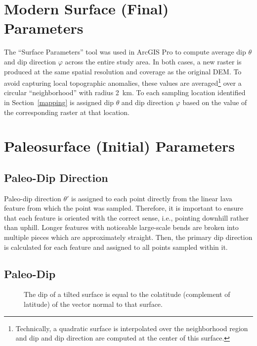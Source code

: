 \section{Modern Surface (Final) Parameters}
The ``Surface Parameters'' tool was used in ArcGIS Pro to compute average dip $\theta$ and dip direction $\varphi$ across the entire study area. In both cases, a new raster is produced at the same spatial resolution and coverage as the original \ac{DEM}. To avoid capturing local topographic anomalies, these values are averaged\footnote{Technically, a quadratic surface is interpolated over the neighborhood region and dip and dip direction are computed at the center of this surface.} over a circular ``neighborhood'' with radius \qty{2}{\km}. To each sampling location identified in Section~\ref{mapping} is assigned dip $\theta$ and dip direction $\varphi$ based on the value of the corresponding raster at that location.

\section{Paleosurface (Initial) Parameters}\label{paleosurface}
\subsection{Paleo-Dip Direction}
Paleo-dip direction $\theta'$ is assigned to each point directly from the linear lava feature from which the point was sampled. Therefore, it is important to ensure that each feature is oriented with the correct sense, i.e., pointing downhill rather than uphill. Longer features with noticeable large-scale bends are broken into multiple pieces which are approximately straight. Then, the primary dip direction is calculated for each feature and assigned to all points sampled within it.

\subsection{Paleo-Dip}\label{paleo-dip}

\def\figsize{3}
\begin{figure}
    \caption[Equivalence of slope and colatitude]{The dip of a tilted surface is equal to the colatitude (complement of latitude) of the vector normal to that surface.}
\end{figure}

